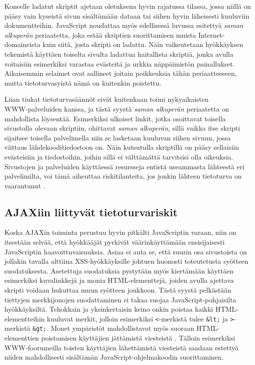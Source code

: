 Koneelle ladatut skriptit ajetaan oletuksena hyvin rajatussa tilassa,
jossa niillä on pääsy vain kyseistä sivun sisältämään dataan tai
siihen hyvin läheisesti kuuluviin dokumentteihin. JavaScript noudattaa
myös \ifdefined\seminaari \relax \else edellisessä luvussa esitettyä
\fi \emph{saman alkuperän} periaatetta, joka estää skriptien
suorittamisen muista In\-ter\-net-do\-mai\-neis\-ta kuin siitä, josta skripti on
ladattu. Näin vaikeutetaan hyökkäyksen tekemistä käyttäen
toiselta sivulta ladattua haitallista skriptiä, jonka avulla
voitaisiin esimerkiksi varastaa evästeitä ja urkkia näppäimistön
painallukset.  Aikaisemmin selaimet ovat sallineet joitain poikkeuksia
tähän periaatteeseen, mutta tietoturvasyistä nämä on kuitenkin
poistettu.

Liian tiukat tietoturvasäännöt eivät kuitenkaan toimi nykyaikaisten\\
WWW-palveluiden kanssa, ja tästä syystä \emph{saman alkuperän}
periaatetta on mahdollista löysentää. Esimerkiksi ulkoiset linkit,
jotka osoittavat toisella sivustolla olevaan skriptiin, ohittavat
\emph{saman alkuperän}, sillä vaikka itse skripti sijaitsee toisella
palvelimella niin se lasketaan kuuluvan siihen sivuun, jossa viittaus
lähdekooditiedostoon on.  Näin kutsutulla skriptillä on pääsy
sellaisiin evästeisiin ja tiedostoihin, joihin sillä ei välttämättä
tarvitsisi olla oikeuksia. Sivustojen ja palveluiden käyttäessä
resursseja entistä useammasta lähteestä eri palvelimilta, voi tämä
aiheuttaa riskitilanteita, jos jonkin lähteen tietoturva on
vaarantunut \cite{AJAX}.

\subsection{AJAXiin liittyvät tietoturvariskit}

Koska AJAXin toiminta perustuu hyvin pitkälti JavaScriptin varaan,
niin on itsestään selvää, että hyökkääjät pyrkivät väärinkäyttämään
ensisijaisesti JavaScriptin haavoittuvaisuuksia.  Asiaa ei auta se,
että suurin osa sivustoista on jollakin tavalla alttiina
XSS-hyök\-käyk\-sil\-le \cite{WEB2c} johtuen huonosti toteutetusta syötteen
suodatuksesta. Asetettuja suodatuksia pystytään myös kiertämään
käyttäen esimerkiksi kuvalinkkejä ja monia HTML-elementtejä,
joiden avulla ajettava skripti voidaan hukuttaa muun syötteen
joukkoon. Tästä syystä pelkästään tiettyjen merkkijonojen
suodattaminen ei takaa suojaa JavaScript-pohjaisilta
hyökkäyksiltä. Tehokkain ja yksinkertaisin keino onkin poistaa kaikki
HTML-e\-le\-ment\-tei\-hin kuuluvat merkit, jolloin esimerkiksi \texttt{<}-merkistä tulee
\texttt{\&lt;} ja \texttt{>}-merkistä \texttt{\&gt;}. Monet ympäristöt
mahdollistavat myös suoraan HTML-e\-le\-ment\-ti\-en poistamisen käyttäjien
jättämistä viesteistä \cite{AJAX}. Tälloin esimerkiksi WWW-foo\-ru\-meil\-la
toisten käyttäjien lähettämistä viesteistä saadaan estettyä
niiden mahdollisesti sisältämän JavaScript-ohjelmakoodin suorittaminen.

